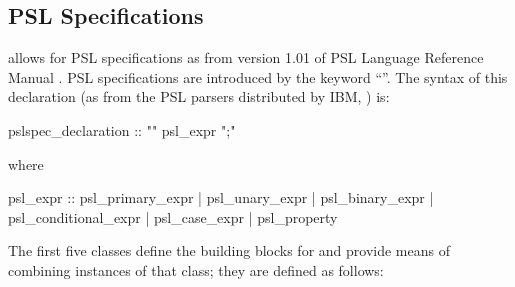 \subsection{PSL Specifications}
\label{PSL Specifications}
%
\nusmv allows for PSL specifications as from version 1.01 of PSL
Language Reference Manual \cite{PSLLRM}. PSL specifications
are introduced by the keyword ``''. The syntax of this
declaration (as from the PSL parsers distributed by IBM, \cite{PSLparser}) is:
%
\begin{Grammar}
pslspec_declaration :: "" psl_expr ";"
\end{Grammar}
%
where
%
\begin{Grammar}
psl_expr ::
   psl_primary_expr
 | psl_unary_expr
 | psl_binary_expr
 | psl_conditional_expr
 | psl_case_expr
 | psl_property
\end{Grammar}
%
The first five classes define the building blocks for
 and provide means of combining
instances of that class; they are defined as follows:

